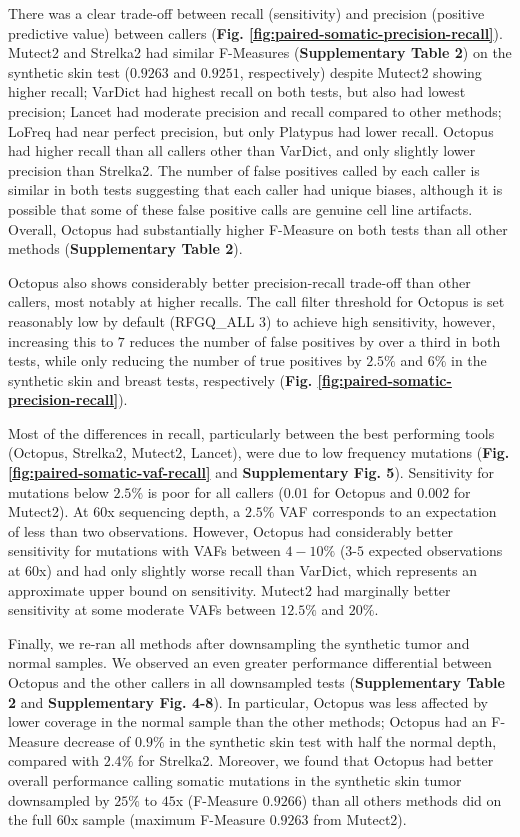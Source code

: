 \documentclass[notitlepage, twocolumn, 10pt]{article}
\begin{document}
There was a clear trade-off between recall (sensitivity) and precision (positive predictive value) between callers (\textbf{Fig. \ref{fig:paired-somatic-precision-recall}}). Mutect2 and Strelka2 had similar F-Measures (\textbf{Supplementary Table 2}) on the synthetic skin test ($0.9263$ and $0.9251$, respectively) despite Mutect2 showing higher recall; VarDict had highest recall on both tests, but also had lowest precision; Lancet had moderate precision and recall compared to other methods; LoFreq had near perfect precision, but only Platypus had lower recall. Octopus had higher recall than all callers other than VarDict, and only slightly lower precision than Strelka2. The number of false positives called by each caller is similar in both tests suggesting that each caller had unique biases, although it is possible that some of these false positive calls are genuine cell line artifacts. Overall, Octopus had substantially higher F-Measure on both tests than all other methods (\textbf{Supplementary Table 2}).

Octopus also shows considerably better precision-recall trade-off than other callers, most notably at higher recalls. The call filter threshold for Octopus is set reasonably low by default (RFGQ\_ALL $3$) to achieve high sensitivity, however, increasing this to $7$ reduces the number of false positives by over a third in both tests, while only reducing the number of true positives by $2.5\%$ and $6\%$ in the synthetic skin and breast tests, respectively (\textbf{Fig. \ref{fig:paired-somatic-precision-recall}}).

Most of the differences in recall, particularly between the best performing tools (Octopus, Strelka2, Mutect2, Lancet), were due to low frequency mutations (\textbf{Fig. \ref{fig:paired-somatic-vaf-recall}} and \textbf{Supplementary Fig. 5}). Sensitivity for mutations below $2.5\%$ is poor for all callers ($0.01$ for Octopus and $0.002$ for Mutect2). At 60x sequencing depth, a $2.5\%$ VAF corresponds to an expectation of less than two observations. However, Octopus had considerably better sensitivity for mutations with VAFs between $4-10\%$ ($3$-$5$ expected observations at 60x) and had only slightly worse recall than VarDict, which represents an approximate upper bound on sensitivity. Mutect2 had marginally better sensitivity at some moderate VAFs between $12.5\%$ and $20\%$.

Finally, we re-ran all methods after downsampling the synthetic tumor and normal samples. We observed an even greater performance differential between Octopus and the other callers in all downsampled tests (\textbf{Supplementary Table 2} and \textbf{Supplementary Fig. 4-8}). In particular, Octopus was less affected by lower coverage in the normal sample than the other methods; Octopus had an F-Measure decrease of $0.9\%$ in the synthetic skin test with half the normal depth, compared with $2.4\%$ for Strelka2. Moreover, we found that Octopus had better overall performance calling somatic mutations in the synthetic skin tumor downsampled by $25\%$ to $45$x (F-Measure $0.9266$) than all others methods did on the full $60$x sample (maximum F-Measure $0.9263$ from Mutect2).
\end{document}

